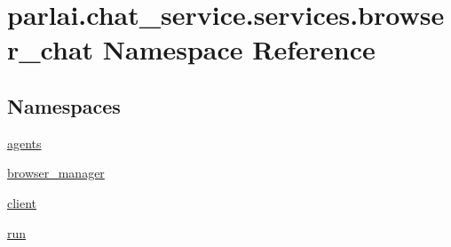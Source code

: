 \hypertarget{namespaceparlai_1_1chat__service_1_1services_1_1browser__chat}{}\section{parlai.\+chat\+\_\+service.\+services.\+browser\+\_\+chat Namespace Reference}
\label{namespaceparlai_1_1chat__service_1_1services_1_1browser__chat}
\subsection*{Namespaces}
\begin{DoxyCompactItemize}
\item 
 \hyperlink{namespaceparlai_1_1chat__service_1_1services_1_1browser__chat_1_1agents}{agents}
\item 
 \hyperlink{namespaceparlai_1_1chat__service_1_1services_1_1browser__chat_1_1browser__manager}{browser\+\_\+manager}
\item 
 \hyperlink{namespaceparlai_1_1chat__service_1_1services_1_1browser__chat_1_1client}{client}
\item 
 \hyperlink{namespaceparlai_1_1chat__service_1_1services_1_1browser__chat_1_1run}{run}
\end{DoxyCompactItemize}
